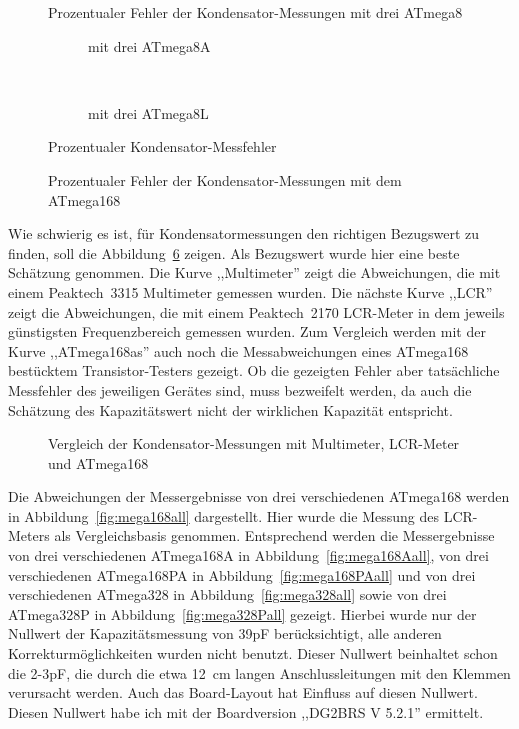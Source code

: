 \begin{figure}[H]
\centering

\caption{Prozentualer Fehler der Kondensator-Messungen mit drei ATmega8}
\label{fig:mega8cap}
\end{figure}

\begin{figure}[H]
  \begin{subfigure}[b]{9cm}
    \centering
    \resizebox{9cm}{!}{}
    \caption{mit drei ATmega8A}
    \label{fig:mega8Acap}
  \end{subfigure}
  ~
  \begin{subfigure}[b]{9cm}
    \centering
    \resizebox{9cm}{!}{}
    \caption{mit drei ATmega8L}
    \label{fig:mega8Lcap}
  \end{subfigure}
  \caption{Prozentualer Kondensator-Messfehler}
\end{figure}

\begin{figure}[H]
\centering

\caption{Prozentualer Fehler der Kondensator-Messungen mit dem ATmega168}
\label{fig:mega168cap}
\end{figure}

Wie schwierig es ist, für Kondensatormessungen den richtigen Bezugswert zu finden, soll die Abbildung~\ref{fig:capcompare} zeigen.
Als Bezugswert wurde hier eine beste Schätzung genommen. Die Kurve ,,Multimeter'' zeigt die Abweichungen, die mit einem
Peaktech~3315 Multimeter gemessen wurden.
Die nächste Kurve ,,LCR'' zeigt die Abweichungen, die mit einem Peaktech~2170 LCR-Meter in dem jeweils günstigsten Frequenzbereich gemessen wurden.
Zum Vergleich werden mit der Kurve ,,ATmega168as'' auch noch die Messabweichungen eines ATmega168 bestücktem Transistor-Testers gezeigt.
Ob die gezeigten Fehler aber tatsächliche Messfehler des jeweiligen Gerätes sind, muss bezweifelt werden, da auch die
Schätzung des Kapazitätswert nicht der wirklichen Kapazität entspricht.

\begin{figure}[H]
\centering

\caption{Vergleich der Kondensator-Messungen mit Multimeter, LCR-Meter und ATmega168}
\label{fig:capcompare}
\end{figure}

Die Abweichungen der Messergebnisse von drei verschiedenen ATmega168 werden in Abbildung~\ref{fig:mega168all} dargestellt.
Hier wurde die Messung des LCR-Meters als Vergleichsbasis genommen.
Entsprechend werden die Messergebnisse von drei verschiedenen ATmega168A in Abbildung~\ref{fig:mega168Aall}, 
von drei verschiedenen ATmega168PA in Abbildung~\ref{fig:mega168PAall} und von drei verschiedenen
ATmega328 in Abbildung~\ref{fig:mega328all} sowie von drei ATmega328P in Abbildung~\ref{fig:mega328Pall} gezeigt.
Hierbei wurde nur der Nullwert der Kapazitätsmessung von 39pF berücksichtigt, alle anderen Korrekturmöglichkeiten wurden
nicht benutzt. Dieser Nullwert beinhaltet schon die 2-3pF, die durch die etwa 12~cm langen Anschlussleitungen mit den
Klemmen verursacht werden.
Auch das Board-Layout hat Einfluss auf diesen Nullwert. Diesen Nullwert habe ich mit der Boardversion ,,DG2BRS V 5.2.1'' ermittelt.


